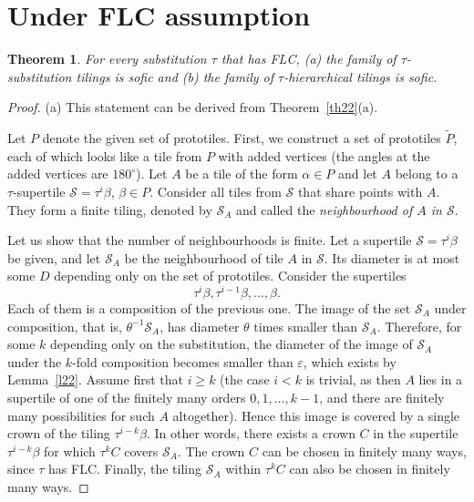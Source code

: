 \documentclass[12pt]{article}
\newtheorem{theorem}{Theorem}
\theoremstyle{remark}
\newcommand{\eps}{\varepsilon}
\begin{document}
\section{Under FLC assumption}



\begin{theorem}\label{th24}
For every  substitution $\tau$ that has FLC,  
(a)  the family of $\tau$-substitution tilings is sofic and (b) the family of $\tau$-hierarchical tilings is sofic.
\end{theorem}
\begin{proof}
(a) This statement can be derived from Theorem~\ref{th22}(a).

Let $P$ denote the given set of prototiles. 
First, we construct a set of prototiles $\tilde P$,
each of which  looks like a tile from $P$ with added
vertices (the angles at the added vertices are $180^\circ$).
Let $A$ be a tile of the form $\alpha\in P$ and let $A$ belong to a $\tau$-supertile
$\mathcal S=\tau^i\beta$, $\beta\in P$. 
Consider all tiles from $\mathcal S$ that share points with $A$. They form a
finite tiling, denoted by ${\mathcal S}_A$ and called the
\emph{neighbourhood of $A$ in $\mathcal S$}.

Let us show that the number of neighbourhoods is finite. Let a supertile $\mathcal S=\tau^i\beta$ be given,
and let $\mathcal S_A$ be the neighbourhood of tile $A$ in $\mathcal S$. Its diameter is at most some $D$ depending only
on the set of prototiles.
Consider the supertiles
$$
\tau^i\beta, \tau^{i-1}\beta,\dots, \beta.
$$
Each of them is a composition of the previous one.
The image of the set $\mathcal S_A$ under composition, that is, $\theta^{-1} \mathcal S_A$, has diameter $\theta$ times smaller than $\mathcal S_A$.
Therefore, for some $k$ depending only on the substitution, the diameter of the image of $\mathcal S_A$ under the $k$-fold
composition becomes smaller than $\eps$, which exists by Lemma~\ref{l22}. Assume first that
$i\ge k$ (the case $i<k$ is trivial, as then $A$ lies in a supertile of one of the finitely many
orders $0,1,\dots,k-1$, and there are finitely many possibilities for such $A$ altogether).
Hence this image
is covered by a single crown of the tiling
 $\tau^{i-k}\beta$. In other words, there exists a crown $C$ in the supertile $\tau^{i-k}\beta$ for which $\tau^k C$
 covers $\mathcal S_A$.
The crown $C$ can be chosen in finitely many ways, since $\tau$ has FLC.
Finally, the tiling $\mathcal S_A$ within $\tau^k C$
can also be chosen in finitely many ways.


\end{proof}
\end{document}
